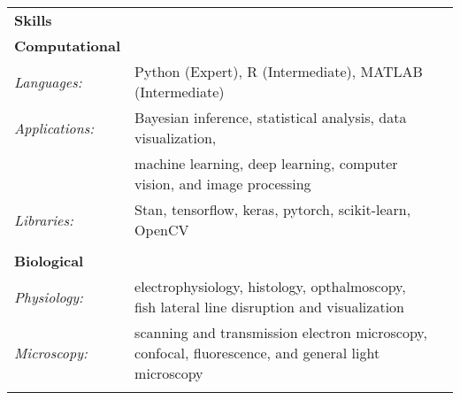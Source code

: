 \documentclass[letterpaper,7pt,oneside]{article}
\begin{document}
\begin{small}
\begin{longtable}{@{} l p{5.3in}l}
\Large{\textbf{Skills}} \vspace{5mm} \\
\large{\textbf{Computational}} \\
\normalsize{\textit{Languages: }}
& Python (Expert), R (Intermediate), MATLAB (Intermediate) \vspace{1mm}\\ %
\normalsize{\textit{Applications: }} 
& Bayesian inference, statistical analysis, data visualization, \\ 
& machine learning, deep learning, computer vision, and image processing \vspace{1mm}\\
\normalsize{\textit{Libraries: }}
& Stan, tensorflow, keras, pytorch, scikit-learn, OpenCV \\
& \\
\large{\textbf{Biological}} \\
\normalsize{\textit{Physiology: }}
& electrophysiology, histology, opthalmoscopy, fish lateral line disruption and visualization \vspace{1mm} \\
\normalsize{\textit{Microscopy: }}
& scanning and transmission electron microscopy, confocal, fluorescence, and general light microscopy \vspace{1mm}\\
& \\
\end{longtable}
\end{small}
\newpage

\end{document}
